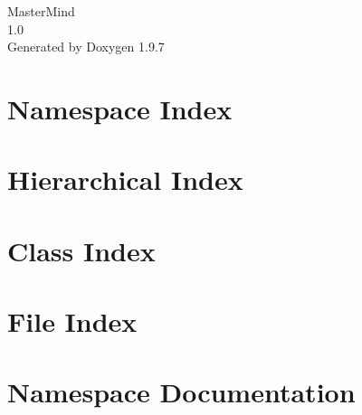 \documentclass[twoside]{book}
\newcommand{\+}{\discretionary{\mbox{\scriptsize$\hookleftarrow$}}{}{}}
\newcommand{\clearemptydoublepage}{%
    \newpage{\pagestyle{empty}\cleardoublepage}%
  }
\begin{document}
  \raggedbottom
    \hypersetup{pageanchor=false,
                bookmarksnumbered=true,
                pdfencoding=unicode
               }
  \begin{titlepage}
  \vspace*{7cm}
  \begin{center}%
  {\Large Master\+Mind}\\
  [1ex]\large 1.\+0 \\
  \vspace*{1cm}
  {\large Generated by Doxygen 1.9.7}\\
  \end{center}
  \end{titlepage}
  \clearemptydoublepage
  \tableofcontents
  \clearemptydoublepage
  \hypersetup{pageanchor=true}
\chapter{Namespace Index}

\chapter{Hierarchical Index}

\chapter{Class Index}

\chapter{File Index}

\chapter{Namespace Documentation}









\end{document}
